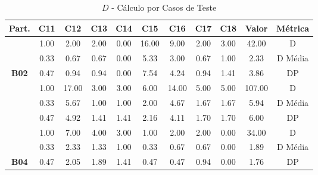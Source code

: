\begin{table}[htbp]
	\centering
	\caption{$D$ - Cálculo por Casos de Teste}
	\begin{tabular}{|c|c|c|c|c|c|c|c|c|cc}
		\hline
		\rowcolor[HTML]{D9D9D9} 
		\cellcolor[HTML]{D0CECE}\textbf{Part.} & \textbf{C11} & \textbf{C12} & \textbf{C13} & \textbf{C14} & \textbf{C15} & \textbf{C16} & \textbf{C17} & \textbf{C18} & \multicolumn{1}{c|}{\cellcolor[HTML]{D0CECE}\textbf{Valor}} & \multicolumn{1}{c|}{\cellcolor[HTML]{D0CECE}\textbf{Métrica}} \\ \hline
		\cellcolor[HTML]{F2F2F2} & 1.00 & 2.00 & 2.00 & 0.00 & 16.00 & 9.00 & 2.00 & 3.00 & \multicolumn{1}{c|}{42.00} & \multicolumn{1}{c|}{D} \\ \cline{2-11} 
		\rowcolor[HTML]{D9D9D9} 
		\cellcolor[HTML]{F2F2F2} & 0.33 & 0.67 & 0.67 & 0.00 & 5.33 & 3.00 & 0.67 & 1.00 & \multicolumn{1}{c|}{\cellcolor[HTML]{D9D9D9}2.33} & \multicolumn{1}{c|}{\cellcolor[HTML]{D9D9D9}D Média} \\ \cline{2-11} 
		\multirow{-3}{*}{\cellcolor[HTML]{F2F2F2}\textbf{B02}} & 0.47 & 0.94 & 0.94 & 0.00 & 7.54 & 4.24 & 0.94 & 1.41 & \multicolumn{1}{c|}{3.86} & \multicolumn{1}{c|}{DP} \\ \hline
		\rowcolor[HTML]{D9D9D9} 
		\cellcolor[HTML]{F2F2F2} & 1.00 & 17.00 & 3.00 & 3.00 & 6.00 & 14.00 & 5.00 & 5.00 & \multicolumn{1}{c|}{\cellcolor[HTML]{D9D9D9}107.00} & \multicolumn{1}{c|}{\cellcolor[HTML]{D9D9D9}D} \\ \cline{2-11} 
		\cellcolor[HTML]{F2F2F2} & 0.33 & 5.67 & 1.00 & 1.00 & 2.00 & 4.67 & 1.67 & 1.67 & \multicolumn{1}{c|}{5.94} & \multicolumn{1}{c|}{D Média} \\ \cline{2-11} 
		\rowcolor[HTML]{D9D9D9} 
		\multirow{-3}{*}{\cellcolor[HTML]{F2F2F2}\textbf{B03}} & 0.47 & 4.92 & 1.41 & 1.41 & 2.16 & 4.11 & 1.70 & 1.70 & \multicolumn{1}{c|}{\cellcolor[HTML]{D9D9D9}6.00} & \multicolumn{1}{c|}{\cellcolor[HTML]{D9D9D9}DP} \\ \hline
		\cellcolor[HTML]{F2F2F2} & 1.00 & 7.00 & 4.00 & 3.00 & 1.00 & 2.00 & 2.00 & 0.00 & \multicolumn{1}{c|}{34.00} & \multicolumn{1}{c|}{D} \\ \cline{2-11} 
		\rowcolor[HTML]{D9D9D9} 
		\cellcolor[HTML]{F2F2F2} & 0.33 & 2.33 & 1.33 & 1.00 & 0.33 & 0.67 & 0.67 & 0.00 & \multicolumn{1}{c|}{\cellcolor[HTML]{D9D9D9}1.89} & \multicolumn{1}{c|}{\cellcolor[HTML]{D9D9D9}D Média} \\ \cline{2-11} 
		\multirow{-3}{*}{\cellcolor[HTML]{F2F2F2}\textbf{B04}} & 0.47 & 2.05 & 1.89 & 1.41 & 0.47 & 0.47 & 0.94 & 0.00 & \multicolumn{1}{c|}{1.76} & \multicolumn{1}{c|}{DP} \\ \hline

\end{tabular}
\end{table}
